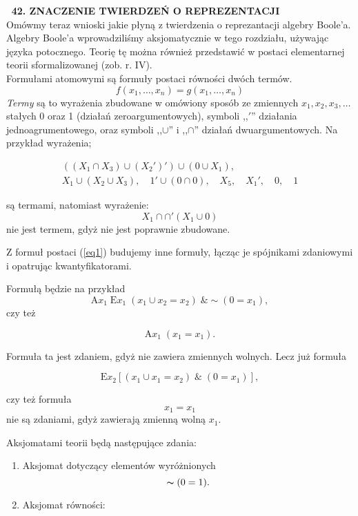 \documentclass[b5paper,8 pt,leqno]{book}
\begin{document}
\normalsize
\textbf{\textsection \, 42. ZNACZENIE TWIERDZEŃ O REPREZENTACJI} \\
\indent Omówmy teraz wnioski jakie płyną z twierdzenia o reprezantacji algebry Boole'a. \\
\indent Algebry Boole'a wprowadziliśmy aksjomatycznie w  tego rozdziału, używając języka potocznego. Teorię tę można również przedstawić w postaci elementarnej teorii sformalizowanej (zob. r. IV). \\
\indent Formułami atomowymi są formuły postaci równości dwóch termów.
\begin{equation}
f(x_1, \dots, x_n) = g(x_1, \dots, x_n)
\label{eq1}
\end{equation}
\textit{Termy} są to wyrażenia zbudowane w omówiony sposób ze zmiennych $x_1, x_2, x_3, \dots$ stałych 0 oraz 1 (działań zeroargumentowych), symboli ,,$'$'' działania jednoagrumentowego, oraz symboli ,,$\cup$'' i ,,$\cap$'' działań dwuargumentowych. Na przykład wyrażenia;

\begin{gather*}
\left( (X_1 \cap X_3) \cup (X_2')'\right) \cup (0 \cup X_1),\\
X_1 \cup (X_2 \cup X_3), \quad 1'\cup(0 \cap 0), \quad X_5, \quad X_1', \quad 0, \quad 1 
\end{gather*}

są termami, natomiast wyrażenie:
\begin{equation*}
X_1 \cap \cap '(X_1\cup 0)
\end{equation*}
nie jest termem, gdyż nie jest poprawnie zbudowane.

\indent Z formuł postaci (\ref{eq1}) budujemy inne formuły, łącząc je spójnikami zdaniowymi i opatrując kwantyfikatorami.

\indent Formułą będzie na przykład
\begin{equation*}
\textrm{A}x_1 \; \textrm{E}x_1 \; (x_1 \cup x_2 = x_2) \; \& \sim (0 = x_1),
\end{equation*}
czy też

\begin{equation*}
\textrm{A}x_1 \; (x_1 = x_1).
\end{equation*}

Formuła ta jest zdaniem, gdyż nie zawiera zmiennych wolnych. Lecz już formuła

\begin{equation*}
\textrm{E}x_2[(x_1 \cup x_1 = x_2) \; \& \; (0=x_1)],
\end{equation*}

czy też formuła 
\begin{equation*}
	x_1 = x_1
\end{equation*}
nie są zdaniami, gdyż zawierają zmienną wolną $x_1$.

\indent Aksjomatami teorii będą następujące zdania:
\begin{enumerate}
	\item Aksjomat dotyczący elementów wyróżnionych
	\begin{equation*}
	\thicksim (0 = 1).
	\end{equation*}
	
	\item Aksjomat równości:
	
\end{enumerate}
\end{document}
